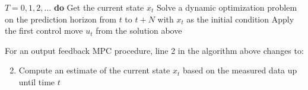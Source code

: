 \begin{codebox}
\li \For $T = 0, 1, 2, \dots$ \textbf{do} \Indentmore
\li Get the current state $x_t$
\li Solve a dynamic optimization problem on
\zi the prediction horizon from $t$ to $t+N$
\zi with $x_t$ as the initial condition
\li Apply the first control move $u_t$ from
\zi the solution above \End
\end{codebox}

\noindent For an output feedback MPC procedure, line 2 in the algorithm above changes to:
%
{ \renewcommand\labelenumi{\theenumi}
\begin{enumerate}
    \setcounter{enumi}{1}
    \item Compute an estimate of the current state $\hat{x}_t$ based on the measured data up until time $t$ 
\end{enumerate}
}